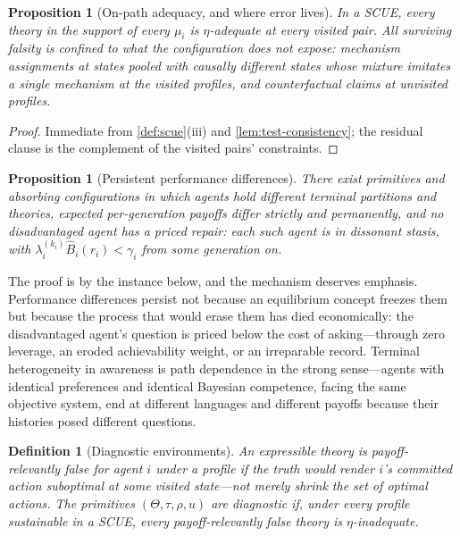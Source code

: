 \documentclass[11pt]{article}
\newtheorem{definition}[assumption]{Definition}
\newtheorem{proposition}[assumption]{Proposition}
\theoremstyle{definition}
\begin{document}
\begin{proposition}[On-path adequacy, and where error lives]
\label{prop:adequacy}
In a SCUE, every theory in the support of every $\mu_i$ is $\eta$-adequate
at every visited pair.  All surviving falsity is confined to what the
configuration does not expose: mechanism assignments at states pooled with
causally different states whose mixture imitates a single mechanism at the
visited profiles, and counterfactual claims at unvisited profiles.
\end{proposition}

\begin{proof}
Immediate from \cref{def:scue}(iii) and \cref{lem:test-consistency}; the
residual clause is the complement of the visited pairs' constraints.
\end{proof}

\begin{proposition}[Persistent performance differences]
\label{prop:persistence}
There exist primitives and absorbing configurations in which agents hold
different terminal partitions and theories, expected per-generation payoffs
differ strictly and permanently, and no disadvantaged agent has a priced
repair: each such agent is in dissonant stasis, with
$\lambda_i^{(k_i)}\widehat B_i(r_i)<\gamma_i$ from some generation on.
\end{proposition}

The proof is by the instance below, and the mechanism deserves emphasis.
Performance differences persist not because an equilibrium concept freezes
them but because the process that would erase them has died economically: the
disadvantaged agent's question is priced below the cost of asking---through
zero leverage, an eroded achievability weight, or an irreparable record.
Terminal heterogeneity in awareness is path dependence in the strong
sense---agents with identical preferences and identical Bayesian competence,
facing the same objective system, end at different languages and different
payoffs because their histories posed different questions.

\begin{definition}[Diagnostic environments]
\label{def:diagnostic}
An expressible theory is \emph{payoff-relevantly false} for agent $i$ under a
profile if the truth would render $i$'s committed action suboptimal at some
visited state---not merely shrink the set of optimal actions.  The primitives
$(\Theta,\tau,\rho,u)$ are \emph{diagnostic} if, under every profile
sustainable in a SCUE, every payoff-relevantly false theory is
$\eta$-inadequate.
\end{definition}
\end{document}
